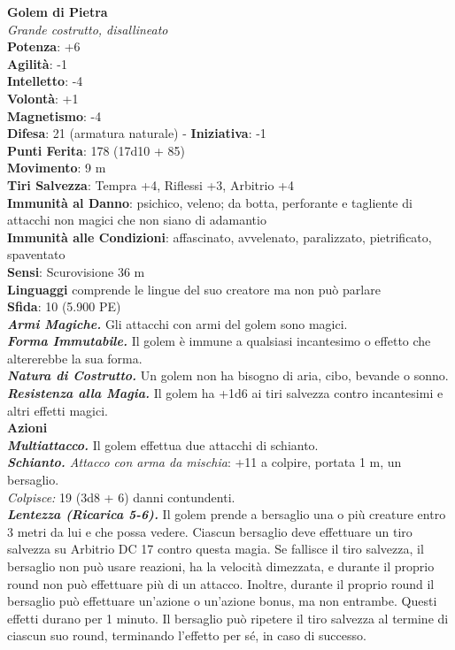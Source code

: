 \begin{multicols}{2}
\medskip\textbf{Golem di Pietra}\\
\emph{Grande costrutto, disallineato}\\
\textbf{Potenza}: +6 \\
\textbf{Agilità}: -1\\
\textbf{Intelletto}: -4\\
\textbf{Volontà}: +1\\
\textbf{Magnetismo}: -4\\
\textbf{Difesa}: 21 (armatura naturale) - \textbf{Iniziativa}: -1\\
\textbf{Punti Ferita}: 178 (17d10 + 85)\\
\textbf{Movimento}: 9 m\\
\textbf{Tiri Salvezza}: Tempra +4, Riflessi +3, Arbitrio +4\\
\textbf{Immunità al Danno}: psichico, veleno; da botta, perforante e tagliente di attacchi non magici che non siano di adamantio\\
\textbf{Immunità alle Condizioni}: affascinato, avvelenato, paralizzato, pietrificato, spaventato\\
\textbf{Sensi}: Scurovisione 36 m\\
\textbf{Linguaggi} comprende le lingue del suo creatore ma non può parlare\\
\textbf{Sfida}: 10 (5.900 PE)\smallskip\\
\emph{\textbf{Armi Magiche.}} Gli attacchi con armi del golem sono magici.\\
\emph{\textbf{Forma Immutabile.}} Il golem è immune a qualsiasi incantesimo o effetto che altererebbe la sua forma.\\
\emph{\textbf{Natura di Costrutto.}} Un golem non ha bisogno di aria, cibo, bevande o sonno.\\
\emph{\textbf{Resistenza alla Magia.}} Il golem ha +1d6 ai tiri salvezza contro incantesimi e altri effetti magici.\\
\smallskip\textbf{Azioni} \\
\emph{\textbf{Multiattacco.}} Il golem effettua due attacchi di schianto.\\
\emph{\textbf{Schianto.} Attacco con arma da mischia}: +11 a colpire, portata 1 m, un bersaglio.\\
\emph{Colpisce:} 19 (3d8 + 6) danni contundenti.\\
\emph{\textbf{Lentezza (Ricarica 5-6).}} Il golem prende a bersaglio una o più creature entro 3 metri da lui e che possa vedere. Ciascun bersaglio deve effettuare un tiro salvezza su Arbitrio DC 17 contro questa magia. Se fallisce il tiro salvezza, il bersaglio non può usare reazioni, ha la velocità dimezzata, e durante il proprio round non può effettuare più di un attacco. Inoltre,  durante il proprio round il bersaglio può effettuare un'azione o un'azione bonus, ma non entrambe. Questi effetti durano per 1 minuto. Il bersaglio può ripetere il tiro salvezza al termine di ciascun suo round, terminando l'effetto per sé, in caso di successo.\\

\end{multicols}
